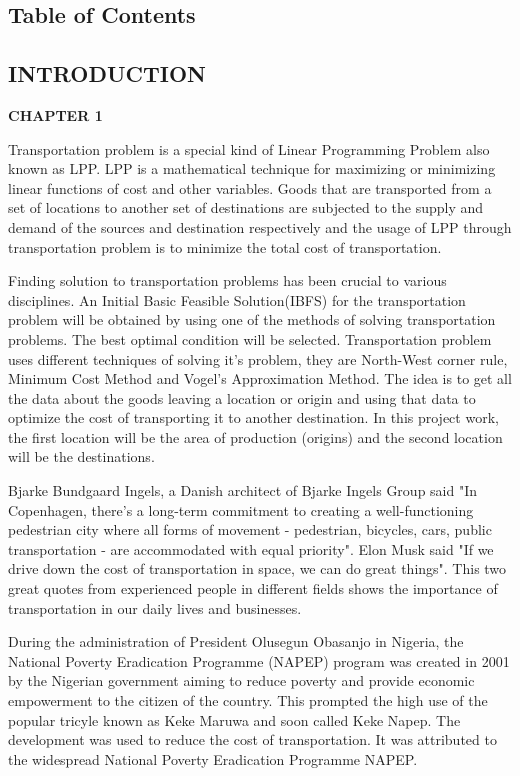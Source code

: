 \documentclass{article}
\begin{document}
\subsection{Table of Contents}
\tableofcontents

\newpage

\begin{center}
\section{INTRODUCTION}
\textbf{CHAPTER 1}
\end{center}

{\large Transportation problem is a special kind of Linear Programming Problem also known as LPP. LPP is a mathematical technique for maximizing or minimizing linear functions of cost and other variables. Goods that are transported from a set of locations to another set of destinations are subjected to the supply and demand of the sources and destination respectively and the usage of LPP through transportation problem is to minimize the total cost of transportation.

Finding solution to transportation problems has been crucial to various disciplines. An Initial Basic Feasible Solution(IBFS) for the transportation problem will be obtained by using one of the methods of solving transportation problems. The best optimal condition will be selected. Transportation problem uses different techniques of solving it's problem, they are North-West corner rule, Minimum Cost Method and Vogel’s Approximation Method. The idea is to get all the data about the goods leaving a location or origin and using that data to optimize the cost of transporting it to another destination. In this project work, the first location will be the area of production (origins) and the second location will be the destinations.

Bjarke Bundgaard Ingels, a Danish architect of Bjarke Ingels Group said "In Copenhagen, there's a long-term commitment to creating a well-functioning pedestrian city where all forms of movement - pedestrian, bicycles, cars, public transportation - are accommodated with equal priority". Elon Musk said "If we drive down the cost of transportation in space, we can do great things". This two great quotes from experienced people in different fields shows the importance of transportation in our daily lives and businesses.

During the administration of President Olusegun Obasanjo in Nigeria, the National Poverty Eradication Programme (NAPEP) program was created in 2001 by the Nigerian government aiming to reduce poverty and provide economic empowerment to the citizen of the country. This prompted the high use of the popular tricyle known as Keke Maruwa and soon called Keke Napep. The development was used to reduce the cost of transportation. It was attributed to the widespread National Poverty Eradication Programme NAPEP.

}
\end{document}
